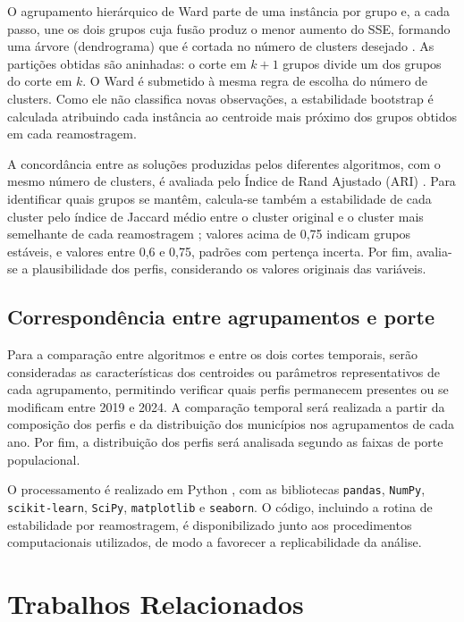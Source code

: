 \documentclass[12pt]{article}
\begin{document}
O agrupamento hierárquico de Ward parte de uma instância por grupo e, a cada passo, une os dois
grupos cuja fusão produz o menor aumento do SSE, formando uma árvore (dendrograma) que é cortada no
número de clusters desejado \cite{ward1963}. As partições obtidas são aninhadas: o corte em $k + 1$
grupos divide um dos grupos do corte em $k$. O Ward é submetido à mesma regra de escolha do número de
clusters. Como ele não classifica novas observações, a estabilidade bootstrap é calculada atribuindo
cada instância ao centroide mais próximo dos grupos obtidos em cada reamostragem.

A concordância entre as soluções produzidas pelos diferentes algoritmos, com o mesmo número de
clusters, é avaliada pelo Índice de Rand Ajustado (ARI) \cite{hubert1985}. Para identificar quais
grupos se mantêm, calcula-se também a estabilidade de cada cluster pelo índice de Jaccard médio entre
o cluster original e o cluster mais semelhante de cada reamostragem \cite{hennig2007}; valores acima
de 0,75 indicam grupos estáveis, e valores entre 0,6 e 0,75, padrões com pertença incerta. Por fim,
avalia-se a plausibilidade dos perfis, considerando os valores originais das variáveis.

\subsection{Correspondência entre agrupamentos e porte}

Para a comparação entre algoritmos e entre os dois cortes temporais, serão consideradas as
características dos centroides ou parâmetros representativos de cada agrupamento, permitindo
verificar quais perfis permanecem presentes ou se modificam entre 2019 e 2024. A comparação temporal
será realizada a partir da composição dos perfis e da distribuição dos municípios nos agrupamentos
de cada ano. Por fim, a distribuição dos perfis será analisada segundo as faixas de porte
populacional.

O processamento é realizado em Python \cite{geron2019}, com as bibliotecas \texttt{pandas},
\texttt{NumPy}, \texttt{scikit-learn}, \texttt{SciPy}, \texttt{matplotlib} e \texttt{seaborn}. O
código, incluindo a rotina de estabilidade por reamostragem, é disponibilizado junto aos
procedimentos computacionais utilizados, de modo a favorecer a replicabilidade da análise.

\section{Trabalhos Relacionados}
\label{sec:relacionados}
\end{document}
